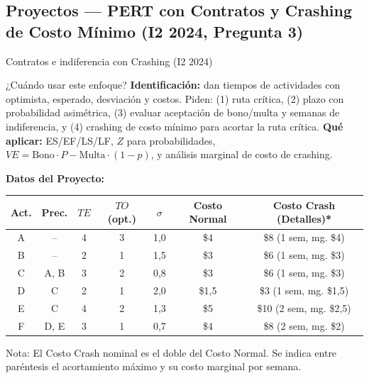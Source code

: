 \subsection[Proyectos: PERT y Crashing (I2 2024)]{Proyectos --- PERT con Contratos y Crashing de Costo Mínimo (I2 2024, Pregunta 3)}

\begin{ejercicio}{Contratos e indiferencia con Crashing (I2 2024)}

\begin{tipprueba}{¿Cuándo usar este enfoque?}
\textbf{Identificación:} dan tiempos de actividades con optimista, esperado, desviación y costos. Piden: (1) ruta crítica, (2) plazo con probabilidad asimétrica, (3) evaluar aceptación de bono/multa y semanas de indiferencia, y (4) crashing de costo mínimo para acortar la ruta crítica. \textbf{Qué aplicar:} ES/EF/LS/LF, $Z$ para probabilidades, $VE = \text{Bono} \cdot P - \text{Multa} \cdot (1-p)$, y análisis marginal de costo de crashing.
\end{tipprueba}

\textbf{Datos del Proyecto:}
\begin{center}\small
\begin{tabular}{@{}ccccccc@{}}
  \toprule
  Act. & Prec. & $TE$ & $TO$ (opt.) & $\sigma$ & Costo Normal & Costo Crash (Detalles)* \\
  \midrule
  A & -- & 4 & 3 & 1{,}0 & \$4 & \$8 (1 sem, mg. \$4) \\
  B & -- & 2 & 1 & 1{,}5 & \$3 & \$6 (1 sem, mg. \$3) \\
  C & A, B & 3 & 2 & 0{,}8 & \$3 & \$6 (1 sem, mg. \$3) \\
  D & C & 2 & 1 & 2{,}0 & \$1{,}5 & \$3 (1 sem, mg. \$1{,}5) \\
  E & C & 4 & 2 & 1{,}3 & \$5 & \$10 (2 sem, mg. \$2{,}5) \\
  F & D, E & 3 & 1 & 0{,}7 & \$4 & \$8 (2 sem, mg. \$2) \\
  \bottomrule
\end{tabular}
\par\smallskip
\scriptsize *Nota: El Costo Crash nominal es el doble del Costo Normal. Se indica entre paréntesis el acortamiento máximo y su costo marginal por semana.
\end{center}


\end{ejercicio}
